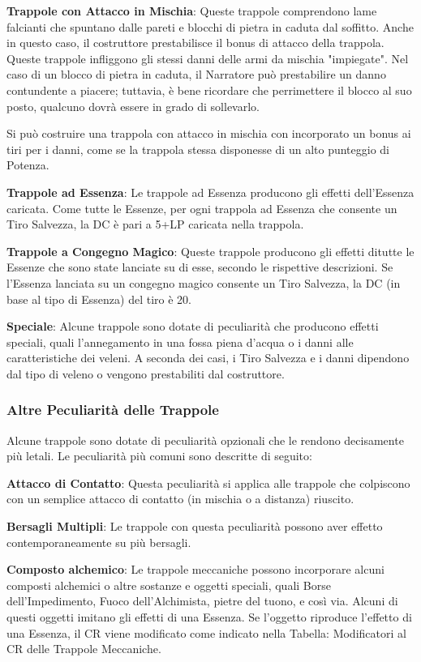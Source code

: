\documentclass[a4paper,11pt,twoside,openany]{book}
\begin{document}
{\textbf{Trappole con Attacco in Mischia}: Queste trappole comprendono lame falcianti che spuntano dalle pareti e blocchi di pietra in caduta dal soffitto. Anche in questo caso, il costruttore prestabilisce il bonus di attacco della trappola. Queste trappole infliggono gli stessi danni delle armi da mischia "impiegate". Nel caso di un blocco di pietra in caduta, il Narratore può prestabilire un danno contundente a piacere; tuttavia, è bene ricordare che perrimettere il blocco al suo posto, qualcuno dovrà essere in grado di sollevarlo.

Si può costruire una trappola con attacco in mischia con incorporato un bonus ai tiri per i danni, come se la trappola stessa disponesse di un alto punteggio di Potenza.

\textbf{Trappole ad Essenza}: Le trappole ad Essenza producono gli effetti dell'Essenza caricata. Come tutte le Essenze, per ogni trappola ad Essenza che consente un Tiro Salvezza, la DC è pari a 5+LP caricata nella trappola.

\textbf{Trappole a Congegno Magico}: Queste trappole producono gli effetti ditutte le Essenze che sono state lanciate su di esse, secondo le rispettive descrizioni. Se l'Essenza lanciata su un congegno magico consente un Tiro Salvezza, la DC (in base al tipo di Essenza) del tiro è 20.

\textbf{Speciale}: Alcune trappole sono dotate di peculiarità che producono effetti speciali, quali l'annegamento in una fossa piena d'acqua o i danni alle caratteristiche dei veleni. A seconda dei casi, i Tiro Salvezza e i danni dipendono dal tipo di veleno o vengono prestabiliti dal costruttore.

\subsubsection{Altre Peculiarità delle Trappole}

Alcune trappole sono dotate di peculiarità opzionali che le rendono decisamente più letali. Le peculiarità più comuni sono descritte di seguito:

\textbf{Attacco di Contatto}: Questa peculiarità si applica alle trappole che colpiscono con un semplice attacco di contatto (in mischia o a distanza) riuscito.

\textbf{Bersagli Multipli}: Le trappole con questa peculiarità possono aver effetto contemporaneamente su più bersagli.

\textbf{Composto alchemico}: Le trappole meccaniche possono incorporare alcuni composti alchemici o altre sostanze e oggetti speciali, quali Borse dell'Impedimento, Fuoco dell'Alchimista, pietre del tuono, e così via. Alcuni di questi oggetti imitano gli effetti di una Essenza. Se l'oggetto riproduce l'effetto di una Essenza, il CR viene modificato come indicato nella Tabella: Modificatori al CR delle Trappole Meccaniche.

}
\end{document}
